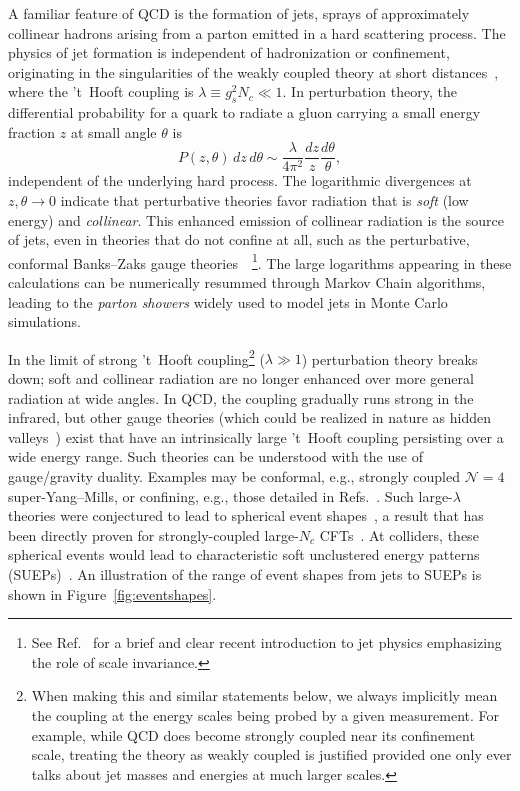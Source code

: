 A familiar feature of QCD is the formation of jets, sprays of approximately collinear hadrons arising from a parton emitted in a hard scattering process. The physics of jet formation is independent of hadronization or confinement, originating in the singularities of the weakly coupled theory at short distances~\cite{Sterman:1977wj}, where the 't~Hooft coupling is $\lambda \equiv g_s^2 N_c \ll 1$. In perturbation theory, the differential probability for a quark to radiate a gluon carrying a small energy fraction $z$ at small angle $\theta$ is
\begin{equation}
\label{eq:scsplit}
  P(z, \theta)\, dz\, d\theta \sim \frac{\lambda}{4\pi^2} \frac{dz}{z} \frac{d\theta}{\theta},
\end{equation}
independent of the underlying hard process. The logarithmic divergences at $z, \theta \to 0$ indicate that perturbative theories favor radiation that is \emph{soft} (low energy) and \emph{collinear}. This enhanced emission of collinear radiation is the source of jets, even in theories that do not confine at all, such as the perturbative, conformal Banks--Zaks gauge theories~\cite{Banks:1981nn}~\footnote{See Ref.~\cite{Larkoski:2017fip} for a brief and clear recent introduction to jet physics emphasizing the role of scale invariance.}. The large logarithms appearing in these calculations can be numerically resummed through Markov Chain algorithms, leading to the \emph{parton showers} widely used to model jets in Monte Carlo simulations.

In the limit of strong 't~Hooft coupling\footnote{When making this and similar statements below, we always implicitly mean the coupling at the energy scales being probed by a given measurement. For example, while QCD does become strongly coupled near its confinement scale, treating the theory as weakly coupled is justified provided one only ever talks about jet masses and energies at much larger scales.} ($\lambda \gg 1$) perturbation theory breaks down; soft and collinear radiation are no longer enhanced over more general radiation at wide angles. In QCD, the coupling gradually runs strong in the infrared, but other gauge theories (which could be realized in nature as hidden valleys~\cite{Strassler:2006im}) exist that have an intrinsically large 't~Hooft coupling persisting over a wide energy range. Such theories can be understood with the use of gauge/gravity duality. Examples may be conformal, e.g., strongly coupled $\mathcal{N} = 4$ super-Yang--Mills, or confining, e.g., those detailed in Refs.~\cite{Polchinski:2000uf, Klebanov:2000hb}. Such large-$\lambda$ theories were conjectured to lead to spherical event shapes~\cite{Strassler:2008bv}, a result that has been directly proven for strongly-coupled large-$N_c$ CFTs~\cite{Hofman:2008ar}. At colliders, these spherical events would lead to characteristic soft unclustered energy patterns (SUEPs)~\cite{Kang:2008ea, Harnik:2008ax, Knapen:2016hky}. An illustration of the range of event shapes from jets to SUEPs is shown in Figure~\ref{fig:eventshapes}.

